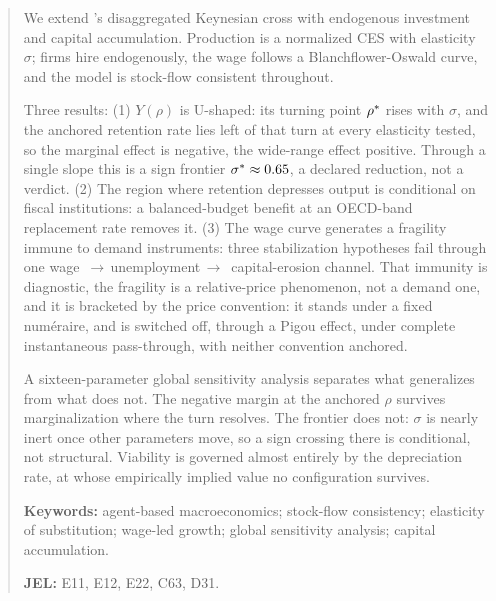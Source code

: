 \begin{abstract}
\noindent
We extend \citet{Teglio2025}'s disaggregated Keynesian cross with endogenous investment and capital accumulation. Production is a normalized CES \citep{KlumpDeLaGrandville2000} with elasticity~$\sigma$; firms hire endogenously, the wage follows a Blanchflower-Oswald curve, and the model is stock-flow consistent throughout.

Three results: (1) $Y(\rho)$ is U-shaped: its turning point $\rhostar$ rises with $\sigma$, and the anchored retention rate lies left of that turn at every elasticity tested, so the marginal effect is negative, the wide-range effect positive. Through a single slope this is a sign frontier $\sigstar \approx 0.65$, a declared reduction, not a verdict. (2) The region where retention depresses output is conditional on fiscal institutions: a balanced-budget benefit at an OECD-band replacement rate removes it. (3) The wage curve generates a fragility immune to demand instruments: three stabilization hypotheses fail through one wage $\,\to\,$unemployment$\,\to\,$ capital-erosion channel. That immunity is diagnostic, the fragility is a relative-price phenomenon, not a demand one, and it is bracketed by the price convention: it stands under a fixed numéraire, and is switched off, through a Pigou effect, under complete instantaneous pass-through, with neither convention anchored.

A sixteen-parameter global sensitivity analysis separates what generalizes from what does not. The negative margin at the anchored $\rho$ survives marginalization where the turn resolves. The frontier does not: $\sigma$ is nearly inert once other parameters move, so a sign crossing there is conditional, not structural.
Viability is governed almost entirely by the depreciation rate, at whose empirically implied value no configuration survives.

\bigskip
\noindent\textbf{Keywords:} agent-based macroeconomics; stock-flow consistency; elasticity of substitution; wage-led growth; global sensitivity
analysis; capital accumulation.

\smallskip
\noindent\textbf{JEL:} E11, E12, E22, C63, D31.
\end{abstract}

\clearpage
\tableofcontents
\clearpage
